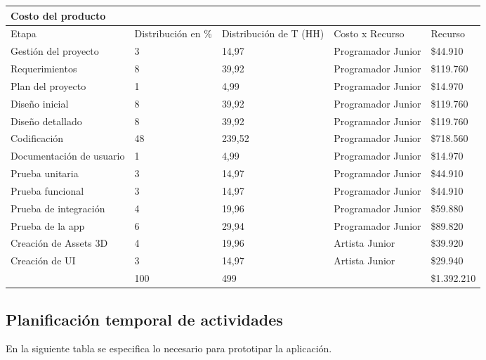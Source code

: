 \begin{longtable}{|p{4cm}|p{2.2cm}|p{2.4cm}|p{2.7cm}|p{2cm}|}
\hline 
Costo del producto  &   &   &   &   \\ 
\hline 
Etapa    & Distribución en \% & Distribución de T (HH) & Costo x Recurso & Recurso \\ 
\hline 
Gestión del proyecto & 3 & 14,97 & Programador Junior & \$44.910 \\ 
\hline 
Requerimientos & 8 & 39,92 & Programador Junior & \$119.760 \\ 
\hline 
Plan del proyecto & 1 & 4,99 & Programador Junior & \$14.970 \\ 
\hline 
Diseño inicial & 8 & 39,92 & Programador Junior & \$119.760 \\ 
\hline 
Diseño detallado & 8 & 39,92 & Programador Junior & \$119.760 \\ 
\hline 
Codificación & 48 & 239,52 & Programador Junior & \$718.560 \\ 
\hline 
Documentación de usuario & 1 & 4,99 & Programador Junior & \$14.970 \\ 
\hline 
Prueba unitaria & 3 & 14,97 & Programador Junior & \$44.910 \\ 
\hline 
Prueba funcional & 3 & 14,97 & Programador Junior & \$44.910 \\ 
\hline 
Prueba de integración & 4 & 19,96 & Programador Junior & \$59.880 \\ 
\hline 
Prueba de la app & 6 & 29,94 & Programador Junior & \$89.820 \\ 
\hline 
Creación de Assets 3D & 4 & 19,96 & Artista Junior & \$39.920 \\ 
\hline 
Creación de UI & 3 & 14,97 & Artista Junior & \$29.940 \\ 
\hline 
  & 100 & 499 &   & \$1.392.210 \\ 
\hline 
\end{longtable} 



\subsection{Planificación temporal de actividades}

En la siguiente tabla se especifica lo necesario para prototipar la aplicación.

